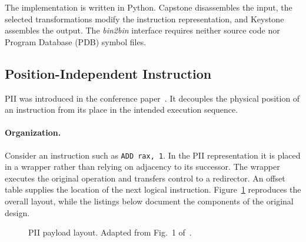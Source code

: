 \documentclass[runningheads]{llncs}
\providecommand{\Description}[1]{}
\begin{document}
The implementation is written in Python. Capstone disassembles the input, the selected transformations modify the instruction representation, and Keystone assembles the output. The \emph{bin2bin} interface requires neither source code nor Program Database (PDB) symbol files.

\subsection{Position-Independent Instruction}\label{sec:pii}
PII was introduced in the conference paper~\cite{zone_secrypt_2026}. It decouples the physical position of an instruction from its place in the intended execution sequence.

\paragraph{Organization.}
Consider an instruction such as \texttt{ADD rax, 1}. In the PII representation it is placed in a wrapper rather than relying on adjacency to its successor. The wrapper executes the original operation and transfers control to a redirector. An offset table supplies the location of the next logical instruction. Figure~\ref{fig:pii_layout} reproduces the overall layout, while the listings below document the components of the original design.

\begin{figure}[t]
\centering
{}
\Description{A schematic separates the initial call, instruction wrappers, redirector components, padding, offset information, and memory region.}
\caption{PII payload layout. Adapted from Fig.~1 of~\cite{zone_secrypt_2026}.}
\label{fig:pii_layout}
\end{figure}
\end{document}

